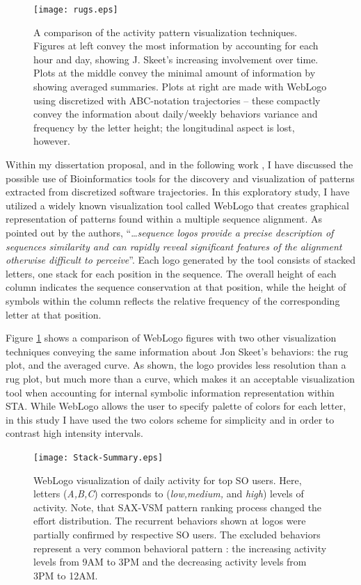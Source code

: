 \begin{figure}[t]
   \centering
   \texttt{[image: rugs.eps]}
   \caption[A comparison of the activity pattern visualization techniques.]{A comparison of the activity pattern visualization techniques. Figures at left convey the most information by accounting for each hour and day, showing J. Skeet's increasing involvement over time. Plots at the middle convey the minimal amount of information by showing averaged summaries. Plots at right are made with WebLogo \cite{weblogo} using discretized with ABC-notation trajectories -- these compactly convey the information about daily/weekly behaviors variance and frequency by the letter height; the longitudinal aspect is lost, however.}
   \label{fig:rugs}   
\end{figure}

Within my dissertation proposal, and in the following work \cite{csdl2-10-09}, I have discussed the possible use of Bioinformatics tools for the discovery and visualization of patterns extracted from discretized software trajectories. In this exploratory study, I have utilized a widely known visualization tool called WebLogo \cite{weblogo} that creates graphical representation of patterns found within a multiple sequence alignment. As pointed out by the authors, ``\dots \textit{sequence logos provide a precise description of sequences similarity and can rapidly reveal significant features of the alignment otherwise difficult to perceive}''. Each logo generated by the tool consists of stacked letters, one stack for each position in the sequence. The overall height of each column indicates the sequence conservation at that position, while the height of symbols within the column reflects the relative frequency of the corresponding letter at that position.

Figure \ref{fig:rugs} shows a comparison of WebLogo figures with two other visualization techniques conveying the same information about Jon Skeet's behaviors: the rug plot, and the averaged curve. As shown, the logo provides less resolution than a rug plot, but much more than a curve, which makes it an acceptable visualization tool when accounting for internal symbolic information representation within STA. While WebLogo allows the user to specify palette of colors for each letter, in this study I have used the two colors scheme for simplicity and in order to contrast high intensity intervals. 

\begin{figure}[t]
   \centering
   \texttt{[image: Stack-Summary.eps]}
   \caption[WebLogo visualization of daily activity for top SO users.]{WebLogo visualization of daily activity for top SO users. Here, letters (\textit{A,B,C}) corresponds to (\textit{low,medium,} and \textit{high}) levels of activity. Note, that SAX-VSM pattern ranking process changed the effort distribution. 
   The recurrent behaviors shown at logos were partially confirmed by respective SO users. 
   The excluded behaviors represent a very common behavioral pattern \cite{activity_patterns}: 
   the increasing activity levels from 9AM to 3PM and the decreasing activity levels from 3PM to 12AM.}
   \label{fig:stack_daily}   
\end{figure}

